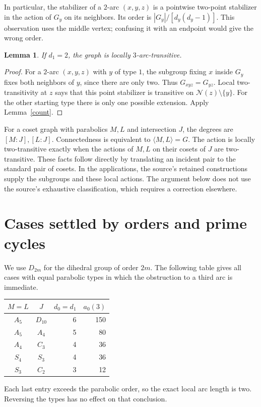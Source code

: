 \documentclass[11pt]{article}
\newtheorem{lemma}{Lemma}
\newcommand{\N}{\mathcal N}
\begin{document}
In particular, the stabilizer of a $2$-arc $(x,y,z)$ is a pointwise
two-point stabilizer in the action of $G_y$ on its neighbors. Its order
is $|G_y|/[d_y(d_y-1)]$. This observation uses the middle vertex;
confusing it with an endpoint would give the wrong order.

\begin{lemma}\label{two}
If $d_1=2$, the graph is locally $3$-arc-transitive.
\end{lemma}
\begin{proof}
For a $2$-arc $(x,y,z)$ with $y$ of type $1$, the subgroup fixing $x$
inside $G_y$ fixes both neighbors of $y$, since there are only two.
Thus $G_{xyz}=G_{yz}$. Local two-transitivity at $z$ says that this
point stabilizer is transitive on $\N(z)\setminus\{y\}$. For the
other starting type there is only one possible extension. Apply
Lemma~\ref{count}.
\end{proof}

For a coset graph with parabolics $M,L$ and intersection $J$, the degrees
are $[M:J],[L:J]$. Connectedness is equivalent to $\langle M,L\rangle=G$.
The action is locally two-transitive exactly when the actions of $M,L$
on their cosets of $J$ are two-transitive. These facts follow directly
by translating an incident pair to the standard pair of cosets. In the
applications, the source's retained constructions supply the subgroups
and these local actions. The argument below does not use the source's
exhaustive classification, which requires a correction elsewhere.

\section{Cases settled by orders and prime cycles}
We use $D_{2m}$ for the dihedral group of order $2m$.
The following table gives all cases with equal parabolic types in which
the obstruction to a third arc is immediate.
\begin{center}
\begin{tabular}{ccrr}
\toprule
$M=L$ & $J$ & $d_0=d_1$ & $a_0(3)$\\\midrule
$A_5$ & $D_{10}$ &6&150\\
$A_5$ & $A_4$ &5&80\\
$A_4$ & $C_3$ &4&36\\
$S_4$ & $S_3$ &4&36\\
$S_3$ & $C_2$ &3&12\\\bottomrule
\end{tabular}
\end{center}
Each last entry exceeds the parabolic order, so the exact local arc
length is two. Reversing the types has no effect on that conclusion.
\end{document}
